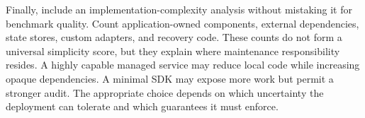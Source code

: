 Finally, include an implementation-complexity analysis without mistaking it for benchmark quality. Count application-owned components, external dependencies, state stores, custom adapters, and recovery code. These counts do not form a universal simplicity score, but they explain where maintenance responsibility resides. A highly capable managed service may reduce local code while increasing opaque dependencies. A minimal SDK may expose more work but permit a stronger audit. The appropriate choice depends on which uncertainty the deployment can tolerate and which guarantees it must enforce.
